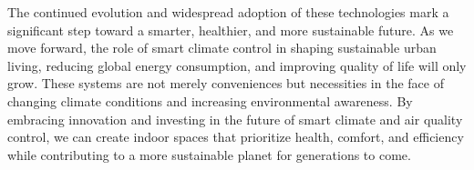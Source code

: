 \documentclass[a4paper]{scrartcl}
\begin{document}
The continued evolution and widespread adoption of these technologies mark a significant step toward a smarter, healthier, and more sustainable future. As we move forward, the role of smart climate control in shaping sustainable urban living, reducing global energy consumption, and improving quality of life will only grow. These systems are not merely conveniences but necessities in the face of changing climate conditions and increasing environmental awareness. By embracing innovation and investing in the future of smart climate and air quality control, we can create indoor spaces that prioritize health, comfort, and efficiency while contributing to a more sustainable planet for generations to come.





\nocite{*}


\printbibliography[title={References}]
\end{document}
